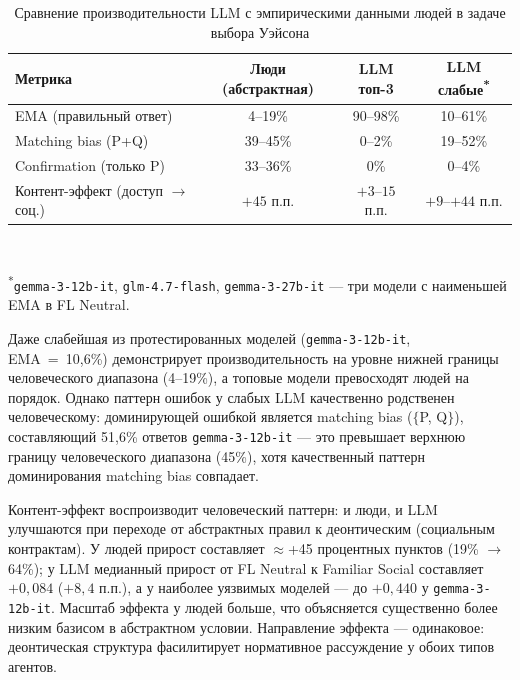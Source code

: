 \begin{table}[h!]
\caption{Сравнение производительности LLM с эмпирическими данными людей в задаче выбора Уэйсона}
\label{tab:human_llm_comparison}
\centering
\begin{tabular}{|l|c|c|c|}
\hline
\textbf{Метрика} & \textbf{Люди (абстрактная)} & \textbf{LLM топ-3} & \textbf{LLM слабые\textsuperscript{*}} \\
\hline
EMA (правильный ответ) & 4--19\% & 90--98\% & 10--61\% \\
Matching bias (P+Q) & 39--45\% & 0--2\% & 19--52\% \\
Confirmation (только P) & 33--36\% & 0\% & 0--4\% \\
Контент-эффект (доступ $\rightarrow$ соц.) & $+45$ п.п. & $+3$--$15$ п.п. & $+9$--$+44$ п.п. \\
\hline
\end{tabular}
\\[2pt]
\raggedright\footnotesize\textsuperscript{*}\texttt{gemma-3-12b-it}, \texttt{glm-4.7-flash}, \texttt{gemma-3-27b-it} --- три модели с наименьшей EMA в FL Neutral.
\end{table}

Даже слабейшая из протестированных моделей (\texttt{gemma-3-12b-it}, EMA~=~10{,}6\%) демонстрирует производительность на уровне нижней границы человеческого диапазона (4--19\%), а топовые модели превосходят людей на порядок. Однако паттерн ошибок у слабых LLM качественно родственен человеческому: доминирующей ошибкой является matching bias ($\{$P, Q$\}$), составляющий 51{,}6\% ответов \texttt{gemma-3-12b-it} --- это превышает верхнюю границу человеческого диапазона (45\%), хотя качественный паттерн доминирования matching bias совпадает.

Контент-эффект воспроизводит человеческий паттерн: и люди, и LLM улучшаются при переходе от абстрактных правил к деонтическим (социальным контрактам). У людей прирост составляет $\approx$+45 процентных пунктов (19\% $\rightarrow$ 64\%); у LLM медианный прирост от FL Neutral к Familiar Social составляет $+0{,}084$ ($+8{,}4$ п.п.), а у наиболее уязвимых моделей --- до $+0{,}440$ у \texttt{gemma-3-12b-it}. Масштаб эффекта у людей больше, что объясняется существенно более низким базисом в абстрактном условии. Направление эффекта --- одинаковое: деонтическая структура фасилитирует нормативное рассуждение у обоих типов агентов.

